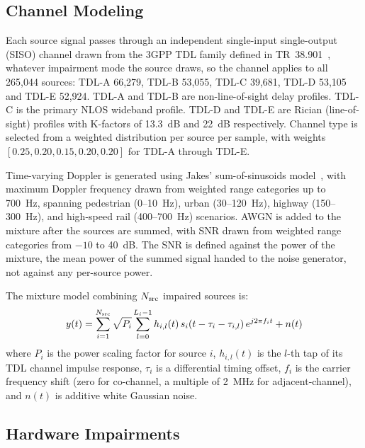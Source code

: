 \documentclass[journal]{IEEEtran}
\begin{document}
\subsection{Channel Modeling}

Each source signal passes through an independent single-input single-output
(SISO) channel drawn from the 3GPP TDL family defined in
TR~38.901~\cite{3gpp38901}, whatever impairment mode the source draws, so the
channel applies to all 265,044 sources: TDL-A 66,279, TDL-B 53,055, TDL-C
39,681, TDL-D 53,105 and TDL-E 52,924. TDL-A and TDL-B are non-line-of-sight delay
profiles. TDL-C is the primary NLOS wideband profile. TDL-D and TDL-E are
Rician (line-of-sight) profiles with K-factors of 13.3~dB and 22~dB
respectively. Channel type is selected from a weighted distribution
per source per sample, with weights
$[0.25, 0.20, 0.15, 0.20, 0.20]$ for TDL-A through TDL-E.

Time-varying Doppler is generated using Jakes' sum-of-sinusoids
model~\cite{jakes1994microwave}, with maximum Doppler frequency drawn from
weighted range categories up to 700~Hz, spanning pedestrian (0--10~Hz),
urban (30--120~Hz), highway (150--300~Hz), and high-speed rail (400--700~Hz)
scenarios. AWGN is added to the mixture after the sources are summed, with SNR
drawn from weighted range categories from $-10$ to 40~dB. The SNR is defined
against the power of the mixture, the mean power of the summed signal handed to
the noise generator, not against any per-source power.

The mixture model combining $N_{\rm src}$ impaired sources is:
\begin{equation}
y(t) = \sum_{i=1}^{N_{\rm src}} \sqrt{P_i}
  \sum_{l=0}^{L_i-1} h_{i,l}(t)\,
  s_i(t - \tau_i - \tau_{i,l})\,
  e^{j2\pi f_i t} + n(t)
\label{eq:mixture}
\end{equation}
where $P_i$ is the power scaling factor for source $i$, $h_{i,l}(t)$ is
the $l$-th tap of its TDL channel impulse response, $\tau_i$ is a
differential timing offset, $f_i$ is the carrier frequency shift
(zero for co-channel, a multiple of 2~MHz for adjacent-channel), and $n(t)$
is additive white Gaussian noise.

\subsection{Hardware Impairments}
\end{document}
